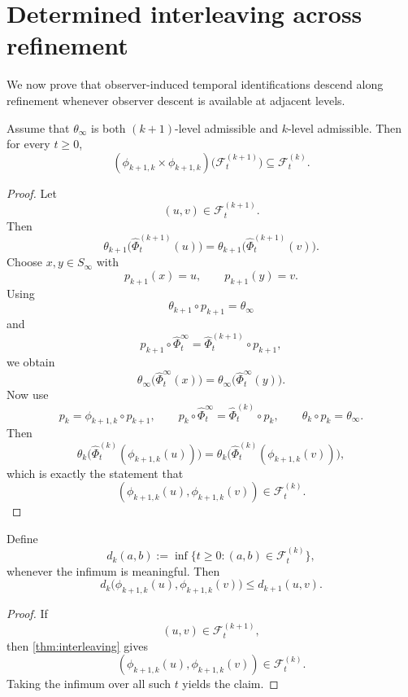 \section{Determined interleaving across refinement}
We now prove that observer-induced temporal identifications descend
along refinement whenever observer descent is available at adjacent
levels.
\begin{theorem}[Interleaving]
	\label{thm:interleaving}
	Assume that \(\theta_\infty\) is both \((k+1)\)-level admissible and
	\(k\)-level admissible.  Then for every \(t\ge 0\),
	\[
		(\phi_{k+1,k}\times \phi_{k+1,k})
		\bigl(\mathcal F_t^{(k+1)}\bigr)
		\subseteq
		\mathcal F_t^{(k)}.
	\]
\end{theorem}
\begin{proof}
	Let
	\[
		(u,v)\in \mathcal F_t^{(k+1)}.
	\]
	Then
	\[
		\theta_{k+1}\bigl(\widehat\Phi_t^{(k+1)}(u)\bigr)
		=
		\theta_{k+1}\bigl(\widehat\Phi_t^{(k+1)}(v)\bigr).
	\]
	Choose \(x,y\in S_\infty\) with
	\[
		p_{k+1}(x)=u,
		\qquad
		p_{k+1}(y)=v.
	\]
	Using
	\[
		\theta_{k+1}\circ p_{k+1}=\theta_\infty
	\]
	and
	\[
		p_{k+1}\circ \widehat\Phi_t^\infty
		=
		\widehat\Phi_t^{(k+1)}\circ p_{k+1},
	\]
	we obtain
	\[
		\theta_\infty\bigl(\widehat\Phi_t^\infty(x)\bigr)
		=
		\theta_\infty\bigl(\widehat\Phi_t^\infty(y)\bigr).
	\]
	Now use
	\[
		p_k=\phi_{k+1,k}\circ p_{k+1},
		\qquad
		p_k\circ \widehat\Phi_t^\infty
		=
		\widehat\Phi_t^{(k)}\circ p_k,
		\qquad
		\theta_k\circ p_k=\theta_\infty.
	\]
	Then
	\[
		\theta_k\bigl(\widehat\Phi_t^{(k)}(\phi_{k+1,k}(u))\bigr)
		=
		\theta_k\bigl(\widehat\Phi_t^{(k)}(\phi_{k+1,k}(v))\bigr),
	\]
	which is exactly the statement that
	\[
		(\phi_{k+1,k}(u),\phi_{k+1,k}(v))
		\in
		\mathcal F_t^{(k)}.
	\]
\end{proof}
\begin{corollary}
	Define
	\[
		d_k(a,b):=\inf\{t\ge0:(a,b)\in \mathcal F_t^{(k)}\},
	\]
	whenever the infimum is meaningful.  Then
	\[
		d_k\bigl(\phi_{k+1,k}(u),\phi_{k+1,k}(v)\bigr)
		\le
		d_{k+1}(u,v).
	\]
\end{corollary}
\begin{proof}
	If
	\[
		(u,v)\in \mathcal F_t^{(k+1)},
	\]
	then \cref{thm:interleaving} gives
	\[
		(\phi_{k+1,k}(u),\phi_{k+1,k}(v))
		\in \mathcal F_t^{(k)}.
	\]
	Taking the infimum over all such \(t\) yields the claim.
\end{proof}
